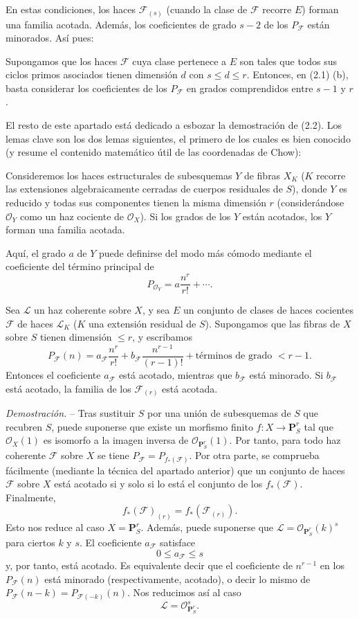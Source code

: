 En estas condiciones, los haces $\mathcal F_{(s)}$ (cuando la clase de
$\mathcal F$ recorre $E$) forman una familia acotada. Además, los coeficientes
de grado $s-2$ de los $P_{\mathcal F}$ están minorados.
Así pues:

 Supongamos que los haces $\mathcal F$ cuya clase
pertenece a $E$ son tales que todos sus ciclos primos asociados tienen
dimensión $d$ con $s\leq d\leq r$. Entonces, en (2.1) (b), basta considerar los
coeficientes de los $P_{\mathcal F}$ en grados comprendidos entre $s-1$ y $r$.

El resto de este apartado está dedicado a esbozar la demostración de (2.2).
Los lemas clave son los dos lemas siguientes, el primero de los cuales es bien
conocido (y resume el contenido matemático útil de las coordenadas de Chow):

 Consideremos los haces estructurales de subesquemas
$Y$ de fibras $X_K$ ($K$ recorre las extensiones algebraicamente cerradas de
cuerpos residuales de $S$), donde $Y$ es reducido y todas sus componentes
tienen la misma dimensión $r$ (considerándose $\mathcal O_Y$ como un haz
cociente de $\mathcal O_X$). Si los grados de los $Y$ están acotados, los $Y$
forman una familia acotada.

Aquí, el grado $a$ de $Y$ puede definirse del modo más cómodo mediante el
coeficiente del término principal de
\[
P_{\mathcal O_Y}=a\frac{n^r}{r!}+\cdots.
\]

 Sea $\mathcal L$ un haz coherente sobre $X$, y sea $E$ un
conjunto de clases de haces cocientes $\mathcal F$ de haces $\mathcal L_K$
($K$ una extensión residual de $S$). Supongamos que las fibras de $X$ sobre
$S$ tienen dimensión $\leq r$, y escribamos
\[
P_{\mathcal F}(n)=a_{\mathcal F}\frac{n^r}{r!}
+b_{\mathcal F}\frac{n^{r-1}}{(r-1)!}
+\text{términos de grado $<r-1$}.
\]
Entonces el coeficiente $a_{\mathcal F}$ está acotado, mientras que
$b_{\mathcal F}$ está minorado. Si $b_{\mathcal F}$ está acotado, la familia
de los $\mathcal F_{(r)}$ está acotada.

\emph{Demostración.} -- Tras sustituir $S$ por una unión de subesquemas de
$S$ que recubren $S$, puede suponerse que existe un morfismo finito
$f:X\longrightarrow\mathbf P^r_S$ tal que $\mathcal O_X(1)$ es isomorfo a la
imagen inversa de $\mathcal O_{\mathbf P^r_S}(1)$. Por tanto, para todo haz
coherente $\mathcal F$ sobre $X$ se tiene
$P_{\mathcal F}=P_{f_*(\mathcal F)}$. Por otra parte, se comprueba fácilmente
(mediante la técnica del apartado anterior) que un conjunto de haces
$\mathcal F$ sobre $X$ está acotado si y solo si lo está el conjunto de los
$f_*(\mathcal F)$. Finalmente,
\[
f_*(\mathcal F)_{(r)}=f_*(\mathcal F_{(r)}).
\]
Esto nos reduce al caso $X=\mathbf P^r_S$. Además, puede suponerse que
$\mathcal L=\mathcal O_{\mathbf P^r_S}(k)^s$ para ciertos $k$ y $s$. El
coeficiente $a_{\mathcal F}$ satisface
\[
0\leq a_{\mathcal F}\leq s
\]
y, por tanto, está acotado. Es equivalente decir que el coeficiente de
$n^{r-1}$ en los $P_{\mathcal F}(n)$ está minorado (respectivamente, acotado),
o decir lo mismo de
$P_{\mathcal F}(n-k)=P_{\mathcal F(-k)}(n)$. Nos reducimos así al caso
\[
\mathcal L=\mathcal O_{\mathbf P^r_S}^{s}.
\]

